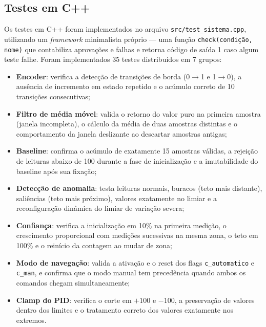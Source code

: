\documentclass[12pt]{article}
\begin{document}
\subsection{Testes em C++}

Os testes em C++ foram implementados no arquivo \texttt{src/test\_sistema.cpp}, utilizando um \textit{framework} minimalista próprio — uma função \texttt{check(condição, nome)} que contabiliza aprovações e falhas e retorna código de saída 1 caso algum teste falhe. Foram implementados 35 testes distribuídos em 7 grupos:

\begin{itemize}
    \item \textbf{Encoder}: verifica a detecção de transições de borda (0$\rightarrow$1 e 1$\rightarrow$0), a ausência de incremento em estado repetido e o acúmulo correto de 10 transições consecutivas;

    \item \textbf{Filtro de média móvel}: valida o retorno do valor puro na primeira amostra (janela incompleta), o cálculo da média de duas amostras distintas e o comportamento da janela deslizante ao descartar amostras antigas;

    \item \textbf{Baseline}: confirma o acúmulo de exatamente 15 amostras válidas, a rejeição de leituras abaixo de 100 durante a fase de inicialização e a imutabilidade do baseline após sua fixação;

    \item \textbf{Detecção de anomalia}: testa leituras normais, buracos (teto mais distante), saliências (teto mais próximo), valores exatamente no limiar e a reconfiguração dinâmica do limiar de variação severa;

    \item \textbf{Confiança}: verifica a inicialização em 10\% na primeira medição, o crescimento proporcional com medições sucessivas na mesma zona, o teto em 100\% e o reinício da contagem ao mudar de zona;

    \item \textbf{Modo de navegação}: valida a ativação e o reset dos flags \texttt{c\_automatico} e \texttt{c\_man}, e confirma que o modo manual tem precedência quando ambos os comandos chegam simultaneamente;

    \item \textbf{Clamp do PID}: verifica o corte em $+100$ e $-100$, a preservação de valores dentro dos limites e o tratamento correto dos valores exatamente nos extremos.
\end{itemize}
\end{document}

